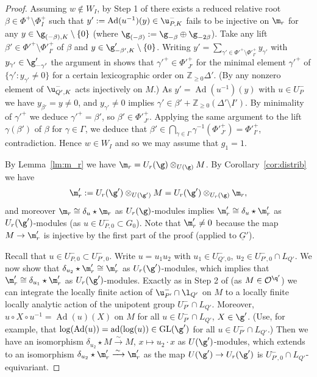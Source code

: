 \documentclass[a4paper]{amsart}
\numberwithin{equation}{section}
\theoremstyle{remark}
\theoremstyle{definition}
\DeclareMathOperator{\Ad}{Ad}
\DeclareMathOperator{\ad}{ad}
\newcommand{\Z}{\mathbb{Z}}
\DeclareMathOperator{\GL}{GL}
\newcommand{\alggrp}[1]{\underline{#1}}
\newcommand{\congto}{\xrightarrow{\,\sim\,}}
\begin{document}
\begin{proof}
  Assuming $w \notin W_I$, by Step 1 of \cite[Theorem 4.7]{OS3} there exists a reduced relative root $\beta \in \Phi^+ \setminus \Phi^+_I$ such
  that $y':=\Ad(u^{-1})(y) \in \u^-_{P,K}$ fails to be injective on $\m_r$ for any $y \in \g_{(-\beta),K}\setminus \{0\}$ (where $\g_{(-\beta)} := \g_{-\beta} \oplus \g_{-2\beta}$).
  Take any lift $\beta' \in \Phi'^+ \setminus \Phi'^+_{I'}$ of $\beta$ and $y \in \g'_{-\beta',K}\setminus \{0\}$.
  Writing $y' = \sum_{\gamma'\in \Phi'^+\setminus \Phi'^+_{I'}} y_{\gamma'}$ with $y_{\gamma'} \in \g'_{-\gamma'}$ the argument
  in \cite[Theorem 4.7]{OS3} shows that $\gamma'^+ \in \Phi'^+_{J'}$ for the minimal element $\gamma'^+$ 
  of $\{\gamma' : y_{\gamma'} \ne 0\}$ for a certain lexicographic order on $\Z_{\ge 0}\Delta'$. 
  (By \cite[Corollary 5.5]{OS3} any nonzero element of $\u_{Q',K}^-$ acts injectively on $M$.)
  As $y'=\Ad(u^{-1})(y)$ with $u \in U^-_P$ we have $y_{\beta'} = y \ne 0$, and $y_{\gamma'} \ne 0$ implies $\gamma' \in \beta'+\Z_{\ge 0}(\Delta'\setminus I')$.
  By minimality of $\gamma'^+$ we deduce $\gamma'^+ = \beta'$, so $\beta' \in \Phi'^+_{J'}$. 
  Applying the same argument to the lift $\gamma(\beta')$ of $\beta$ for $\gamma \in \Gamma$, we deduce that
  $\beta' \in \bigcap_{\gamma \in \Gamma} \gamma^{-1}(\Phi'^+_{J'}) = \Phi'^+_{I'}$, contradiction. 
  Hence $w \in W_I$ and so we may assume that $g_1 = 1$.

  By Lemma~\ref{lm:m_r} we have $\m_r = U_r(\g) \otimes_{U(\g)} M$. By Corollary~\ref{cor:distrib} we have
  \begin{equation*}
    \m'_r := U_r(\g') \otimes_{U(\g')} M = U_r(\g') \otimes_{U_r(\g)} \m_r,
  \end{equation*}
  and moreover $\m_r \cong \delta_{u} \star \m_r$ as $U_r(\g)$-modules implies 
  $\m'_r \cong \delta_{u} \star \m'_r$ as $U_r(\g')$-modules (as $u \in U^-_{P,0} \subset G_0$).   Note that $\m'_r \ne 0$   because the map $M \to \m'_r$ is injective by the first part of the proof (applied to $\alggrp G'$).

  Recall that $u \in U^-_{P,0} \subset U^-_{P',0}$.
  Write $u = u_1 u_2$ with $u_1 \in U^-_{Q',0}$, $u_2 \in U_{P',0}^- \cap L_{Q'}$. We now show that $\delta_{u_2} \star \m_r' \cong \m_r'$
  as $U_r(\g')$-modules, which implies that $\m_r' \cong \delta_{u_1} \star \m_r'$ as $U_r(\g')$-modules.
  Exactly as in Step 2 of \cite[Theorem 4.7]{OS3} (as $M \in \mathcal O^{\q'}$) we can integrate the locally finite action of $\u_{P'}^- \cap \l_{Q'}$ on $M$ to a locally finite locally analytic 
  action of the unipotent group $U_{P'}^- \cap L_{Q'}$. 
  Moreover, $u \circ X \circ u^{-1} = \Ad(u)(X)$ on $M$ for all $u \in U_{P'}^- \cap L_{Q'}$, $X \in \g'$. 
  (Use, for example, that $\log(\Ad(u)) = \ad(\log(u)) \in \GL(\g')$ for all $u \in U_{P'}^- \cap L_{Q'}$.)
  Then we have an isomorphism $\delta_{u_2} \star M \congto M$, $x \mapsto u_2 \cdot x$ as $U(\g')$-modules, which extends
  to an isomorphism $\delta_{u_2} \star \m'_r \congto \m'_r$ as the map $U(\g') \to U_r(\g')$ is $U_{P',0}^- \cap L_{Q'}$-equivariant.


\end{proof}
\end{document}
